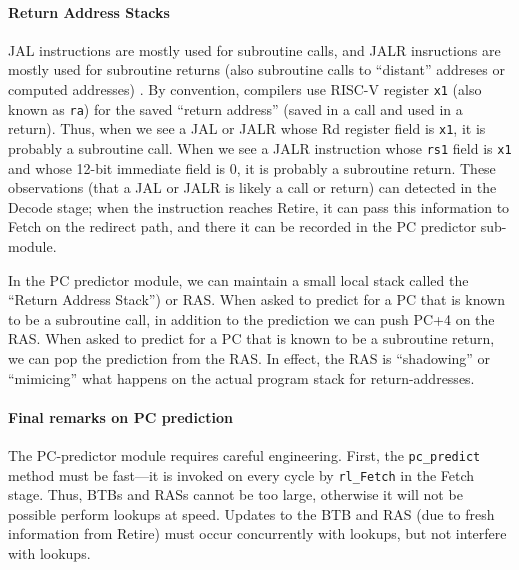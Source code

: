 
\paragraph{Return Address Stacks}

\label{Sec_RAS}


JAL instructions are mostly used for subroutine calls, and JALR
insructions are mostly used for subroutine returns (also subroutine
calls to ``distant'' addreses or computed addresses) .  By convention,
compilers use RISC-V register \verb|x1| (also known as \verb|ra|) for
the saved ``return address'' (saved in a call and used in a return).
Thus, when we see a JAL or JALR whose Rd register field is \verb|x1|,
it is probably a subroutine call.  When we see a JALR instruction
whose \verb|rs1| field is \verb|x1| and whose 12-bit immediate field
is 0, it is probably a subroutine return.  These observations (that a
JAL or JALR is likely a call or return) can detected in the Decode
stage; when the instruction reaches Retire, it can pass this
information to Fetch on the redirect path, and there it can be
recorded in the PC predictor sub-module.

In the PC predictor module, we can maintain a small local stack called
the ``Return Address Stack'') or RAS.  When asked to predict for a PC
that is known to be a subroutine call, in addition to the prediction
we can push PC+4 on the RAS.  When asked to predict for a PC that is
known to be a subroutine return, we can pop the prediction from the
RAS.  In effect, the RAS is ``shadowing'' or ``mimicing'' what happens
on the actual program stack for return-addresses.


\paragraph{Final remarks on PC prediction}

The PC-predictor module requires careful engineering.  First, the
\verb|pc_predict| method must be fast---it is invoked on every cycle
by \verb|rl_Fetch| in the Fetch stage.  Thus, BTBs and RASs cannot be
too large, otherwise it will not be possible perform lookups at speed.
Updates to the BTB and RAS (due to fresh information from Retire) must
occur concurrently with lookups, but not interfere with lookups.

